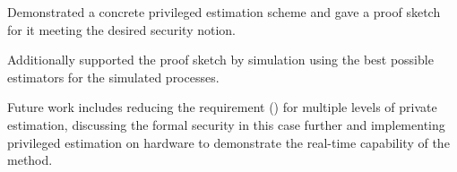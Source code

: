 \documentclass[letterpaper, 10 pt, conference]{IEEEtran}
\theoremstyle{definition}
\theoremstyle{definition}
\theoremstyle{remark}
\begin{document}
Demonstrated a concrete privileged estimation scheme and gave a proof sketch for it meeting the desired security notion.

Additionally supported the proof sketch by simulation using the best possible estimators for the simulated processes.

Future work includes reducing the requirement () for multiple levels of private estimation, discussing the formal security in this case further and implementing privileged estimation on hardware to demonstrate the real-time capability of the method.






\end{document}
